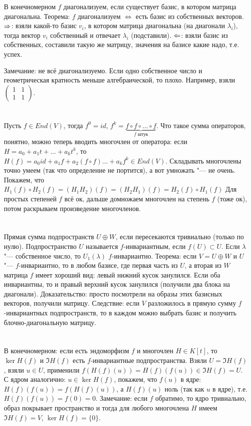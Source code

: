 В конечномерном $f$ диагонализуем, если существует базис, в котором матрица диагональна.
Теорема: $f$ диагонализуем $\iff$ есть базис из собственных векторов.
$\Rightarrow$: взяли какой-то базис $v_i$, в котором матрица диагональна (на диагонали $\lambda_i$), тогда вектор $v_i$ собственный и отвечает $\lambda_i$ (подставили).
$\Leftarrow$: взяли базис из собственных, составили такую же матрицу, значения на базисе какие надо, т.е. успех.

Замечание: не всё диагонализуемо.
Если одно собственное число и геометрическая кратность меньше алгебраической, то плохо.
Например, взяли $\begin{pmatrix}1&1\\1&1\end{pmatrix}$.

\section{} %
Пусть $f \in End(V)$, тогда $f^0 = id$, $f^k = \underbrace{f \circ f \circ \dots \circ f}_{f\text{~штук}}$.
Что такое сумма операторов, понятно, можно теперь вводить многочлен от оператора:
если $H=a_0+a_1t + \dots + a_kt^k$, то $H(f)=a_0 id + a_1 f + a_2 (f\circ f) \dots + a_k f^k \in End(V)$.
Складывать многочлены точно умеем (так что определение не портится), а вот умножать "--- не очень.
Покажем, что $H_1(f) \circ H_2(f) = (H_1H_2)(f) = (H_2H_1)(f) = H_2(f) \circ H_1(f)$
Для простых степеней $f$ всё ок, дальше домножаем многочлен на степень $f$ (тоже ок), потом раскрываем произведение многочленов.

\section{} %
Прямая сумма подпространств $U \oplus W$, если пересекаются тривиально (только по нулю).
Подпространство $U$ называется $f$-инвариантным, если $f(U) \subset U$.
Если $\lambda$ "--- собственное число, то $U_1(\lambda)$ $f$-инвариантно.
Теорема: если $V = U \oplus W$ и $U$ "--- $f$-инвариантно, то в любом базисе, где первая часть из $U$, а вторая из $W$ матрица $f$ имеет хороший вид: левый нижний кусок занулился.
Если оба инвариантны, то и правый верхний кусок занулился (получили два блока на диагонали).
Доказательство: просто посмотрели на образы этих базисных векторов, получили матрицу.
Следствие: если $V$ разложилось в прямую сумму $f$-инвариантных подпространств, то в каждом можно выбрать базис и получить блочно-диагональную матрицу.

\section{} %
В конечномерном: если есть эндоморфизм $f$ и многочлен $H \in K[t]$, то $\ker H(f)$ и $\Im H(f)$ есть $f$-инвариантные подпространства.
Взяли $U=\Im H(f)$, взяли $u \in U$, применили $f(H(f)(u)) = H(f)(f(u)) \in \Im H(f) = U$.
С ядром аналогично: $u \in \ker H(f)$, покажем, что $f(u)$ в ядре: $H(f)(f(u)) = f(H(f)(u))$, а $H(f)(u)$ ноль (так как $u$ в ядре), т.е. $H(f)(f(u))=f(0)=0$.
Замечание: если $f$ обратимо, то ядро тривиально, образ покрывает пространство и тогда для любого многочлена $H$ имеем $\Im H(f) = V$, $\ker H(f) = \{0\}$.

